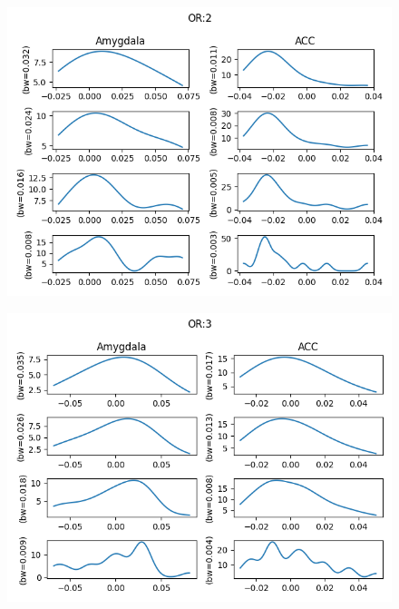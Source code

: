 \documentclass[twoside,12pt]{article}
\begin{document}
\begin{enumerate}[label*=\arabic*.]
 \begin{figure}[H]
        \centering
        \includegraphics[width=\textwidth, height=\textwidth]{images/1D OR2 amyg+acc.png}
    \end{figure}
 \begin{figure}[H]
        \centering
        \includegraphics[width=\textwidth, height=\textwidth]{images/1D OR3 amyg+acc.png}

\end{figure}
\end{enumerate}
\end{document}
